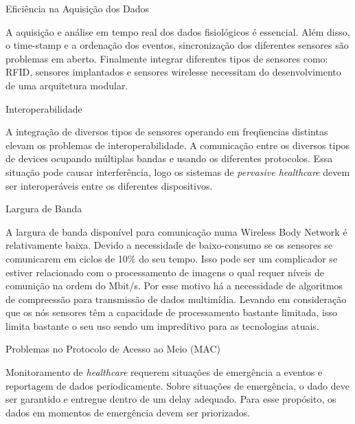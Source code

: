 \documentclass{beamer}
\begin{document}
\begin{frame}{Eficiência na Aquisição dos Dados}
  \begin{block}{}    
  A aquisição e análise em tempo real dos dados fisiológicos é essencial. Além disso, o time-stamp e a ordenação dos eventos, sincronização dos diferentes sensores são problemas em aberto. Finalmente integrar diferentes tipos de sensores como: RFID, sensores implantados e sensores wirelesse necessitam do desenvolvimento de uma arquitetura modular.
  \end{block}
\end{frame}

\begin{frame}{Interoperabilidade}
  \begin{block}{}
    A integração de diversos tipos de sensores operando em freqüencias distintas elevam os problemas de interoperabilidade. A comunicação entre os diversos tipos de devices ocupando múltiplas bandas e usando os diferentes protocolos. Essa situação pode causar interferência, logo os sistemas de \textit{pervasive healthcare} devem ser interoperáveis entre os diferentes dispositivos.
  \end{block}
\end{frame}

\begin{frame}{Largura de Banda}
  \begin{block}{}
  A largura de banda disponível para comunicação numa Wireless Body Network é relativamente baixa. Devido a necessidade de baixo-consumo se os sensores se comunicarem em ciclos de 10$\%$ do seu tempo. Isso pode ser um complicador se estiver relacionado com o processamento de imagens o qual requer níveis de comunição na ordem do Mbit/s. Por esse motivo há a necessidade de algoritmos de compreessão para transmissão de dados multimídia. Levando em consideração que os nós sensores têm a capacidade de processamento bastante limitada, isso limita bastante o seu uso sendo um impreditivo para as tecnologias atuais.
  \end{block}
\end{frame}

\begin{frame}{Problemas no Protocolo de Acesso ao Meio (MAC)}
  \begin{block}{}
  Monitoramento de \textit{healthcare} requerem situações de emergência a eventos e reportagem de dados periodicamente. Sobre situações de emergência, o dado deve ser garantido e entregue dentro de um delay adequado. Para esse propósito, os dados em momentos de emergência devem ser priorizados.   
  \end{block}
\end{frame}
\end{document}
